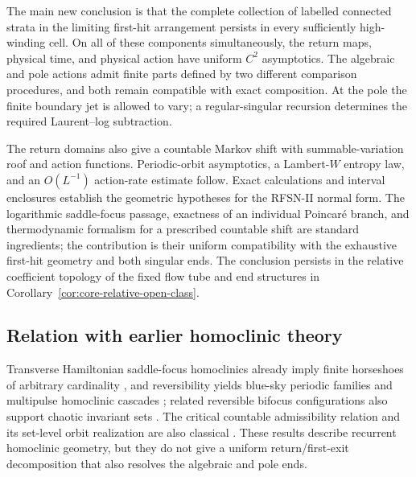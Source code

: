 \documentclass[11pt]{amsart}
\numberwithin{equation}{section}
\theoremstyle{definition}
\theoremstyle{remark}
\begin{document}
The main new conclusion is that the complete collection of labelled
connected strata in the limiting first-hit arrangement persists in every sufficiently
high-winding cell.  On all of these components simultaneously, the return
maps, physical time, and physical action have uniform $C^2$ asymptotics.
The algebraic and pole actions admit finite parts defined by two different
comparison procedures, and both remain compatible with exact composition.
At the pole the finite boundary jet is allowed to vary; a regular-singular
recursion determines the required Laurent--log subtraction.

The return domains also give a countable Markov shift with
summable-variation roof and action functions.  Periodic-orbit asymptotics,
a Lambert-$W$ entropy law, and an $O(L^{-1})$ action-rate estimate follow.
Exact calculations and interval enclosures establish the geometric
hypotheses for the RFSN-II normal form.  The logarithmic saddle-focus
passage, exactness of an individual Poincar\'e branch, and thermodynamic
formalism for a prescribed countable shift are standard ingredients; the
contribution is their uniform compatibility with the exhaustive first-hit
geometry and both singular ends.  The conclusion persists in the relative
coefficient topology of the fixed flow tube and end structures in
Corollary~\ref{cor:core-relative-open-class}.

\subsection{Relation with earlier homoclinic theory}

Transverse Hamiltonian saddle-focus homoclinics already imply finite
horseshoes of arbitrary cardinality \cite{Devaney1976Homoclinic}, and
reversibility yields blue-sky periodic families and multipulse homoclinic
cascades \cite{Devaney1977BlueSky,Harterich1998Cascades}; related
reversible bifocus configurations also support chaotic invariant sets
\cite{BarrientosRaibekasRodrigues2019Chaos}.  The critical
countable admissibility relation and its set-level orbit realization are also
classical \cite{Lerman1991ComplexDynamics,Lerman1997HomoHeteroclinic,
Lerman2000DynamicalPhenomena}.  These results describe recurrent
homoclinic geometry, but they do not give a uniform return/first-exit
decomposition that also resolves the algebraic and pole ends.
\end{document}

